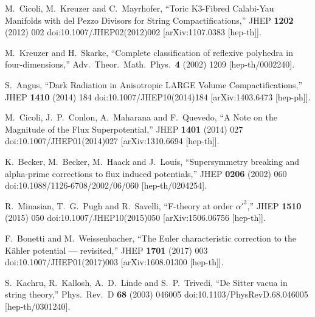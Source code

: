 \documentclass[11pt,a4paper]{article}
\begin{document}
\begin{thebibliography}{99}
  M.~Cicoli, M.~Kreuzer and C.~Mayrhofer,
  ``Toric K3-Fibred Calabi-Yau Manifolds with del Pezzo Divisors for String Compactifications,''
  JHEP {\bf 1202} (2012) 002
  doi:10.1007/JHEP02(2012)002
  [arXiv:1107.0383 [hep-th]].

  M.~Kreuzer and H.~Skarke,
  ``Complete classification of reflexive polyhedra in four-dimensions,''
  Adv.\ Theor.\ Math.\ Phys.\  {\bf 4} (2002) 1209
  [hep-th/0002240].

  S.~Angus,
  ``Dark Radiation in Anisotropic LARGE Volume Compactifications,''
  JHEP {\bf 1410} (2014) 184
  doi:10.1007/JHEP10(2014)184
  [arXiv:1403.6473 [hep-ph]].

  M.~Cicoli, J.~P.~Conlon, A.~Maharana and F.~Quevedo,
  ``A Note on the Magnitude of the Flux Superpotential,''
  JHEP {\bf 1401} (2014) 027
  doi:10.1007/JHEP01(2014)027
  [arXiv:1310.6694 [hep-th]].

  K.~Becker, M.~Becker, M.~Haack and J.~Louis,
  ``Supersymmetry breaking and alpha-prime corrections to flux induced potentials,''
  JHEP {\bf 0206} (2002) 060
  doi:10.1088/1126-6708/2002/06/060
  [hep-th/0204254].

  R.~Minasian, T.~G.~Pugh and R.~Savelli,
  ``F-theory at order $\alpha'^3$,''
  JHEP {\bf 1510} (2015) 050
  doi:10.1007/JHEP10(2015)050
  [arXiv:1506.06756 [hep-th]].

  F.~Bonetti and M.~Weissenbacher,
  ``The Euler characteristic correction to the Kähler potential — revisited,''
  JHEP {\bf 1701} (2017) 003
  doi:10.1007/JHEP01(2017)003
  [arXiv:1608.01300 [hep-th]].

  S.~Kachru, R.~Kallosh, A.~D.~Linde and S.~P.~Trivedi,
  ``De Sitter vacua in string theory,''
  Phys.\ Rev.\ D {\bf 68} (2003) 046005
  doi:10.1103/PhysRevD.68.046005
  [hep-th/0301240].


\end{thebibliography}
\end{document}
